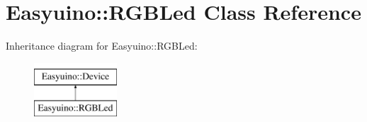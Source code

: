 \hypertarget{class_easyuino_1_1_r_g_b_led}{}\section{Easyuino\+:\+:R\+G\+B\+Led Class Reference}
\label{class_easyuino_1_1_r_g_b_led}
Inheritance diagram for Easyuino\+:\+:R\+G\+B\+Led\+:\begin{figure}[H]
\begin{center}
\leavevmode
\includegraphics[height=2.000000cm]{class_easyuino_1_1_r_g_b_led}
\end{center}
\end{figure}
